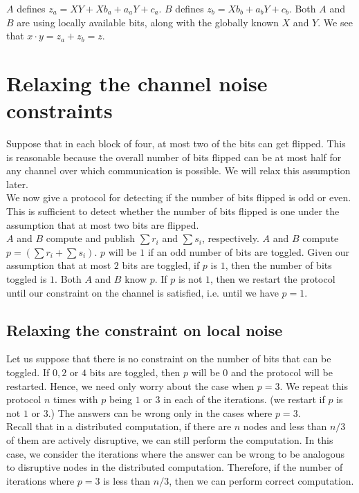 \documentclass[11pt]{article}
\begin{document}
$A$ defines $z_a = XY + X b_a + a_a Y + c_a$. $B$ defines $z_b = X b_b + a_b Y + c_b$. Both $A$ and $B$ are using locally available bits, along with the globally known $X$ and $Y$. We see that $x \cdot y = z_a + z_b = z$.

\section{Relaxing the channel noise constraints}
Suppose that in each block of four, at most two of the bits can get flipped. This is reasonable because the overall number of bits flipped can be at most half for any channel over which communication is possible. We will relax this assumption later.\\

We now give a protocol for detecting if the number of bits flipped is odd or even. This is sufficient to detect whether the number of bits flipped is one under the assumption that at most two bits are flipped.\\

$A$ and $B$ compute and publish $\sum r_i$ and $\sum s_i$, respectively. $A$ and $B$ compute $p = (\sum r_i + \sum s_i)$. $p$ will be $1$ if an odd number of bits are toggled. Given our assumption that at most $2$ bits are toggled, if $p$ is $1$, then the number of bits toggled is $1$. Both $A$ and $B$ know $p$. If $p$ is not $1$, then we restart the protocol until our constraint on the channel is satisfied, i.e. until we have $p = 1$.

\subsection{Relaxing the constraint on local noise}
Let us suppose that there is no constraint on the number of bits that can be toggled. If $0, 2$ or $4$ bits are toggled, then $p$ will be $0$ and the protocol will be restarted. Hence, we need only worry about the case when $p = 3$. We repeat this protocol $n$ times with $p$ being $1$ or $3$ in each of the iterations. (we restart if $p$ is not $1$ or $3$.) The answers can be wrong only in the cases where $p = 3$. \\

Recall that in a distributed computation, if there are $n$ nodes and less than $n/3$ of them are actively disruptive, we can still perform the computation. In this case, we consider the iterations where the answer can be wrong to be analogous to disruptive nodes in the distributed computation. Therefore, if the number of iterations where $p = 3$ is less than $n/3$, then we can perform correct computation. \\
\end{document}
